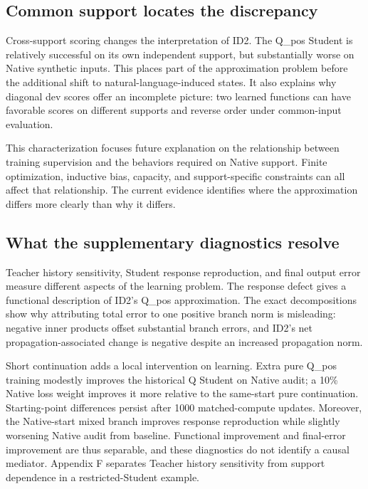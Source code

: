 \subsection{Common support locates the discrepancy}\label{common-support-locates-the-discrepancy}

Cross-support scoring changes the interpretation of ID2. The Q\_pos Student is relatively successful on its own independent support, but substantially worse on Native synthetic inputs. This places part of the approximation problem before the additional shift to natural-language-induced states. It also explains why diagonal dev scores offer an incomplete picture: two learned functions can have favorable scores on different supports and reverse order under common-input evaluation.

This characterization focuses future explanation on the relationship between training supervision and the behaviors required on Native support. Finite optimization, inductive bias, capacity, and support-specific constraints can all affect that relationship. The current evidence identifies where the approximation differs more clearly than why it differs.

\subsection{What the supplementary diagnostics resolve}\label{what-the-supplementary-diagnostics-resolve}

Teacher history sensitivity, Student response reproduction, and final output error measure different aspects of the learning problem. The response defect gives a functional description of ID2's Q\_pos approximation. The exact decompositions show why attributing total error to one positive branch norm is misleading: negative inner products offset substantial branch errors, and ID2's net propagation-associated change is negative despite an increased propagation norm.

Short continuation adds a local intervention on learning. Extra pure Q\_pos training modestly improves the historical Q Student on Native audit; a 10\% Native loss weight improves it more relative to the same-start pure continuation. Starting-point differences persist after 1000 matched-compute updates. Moreover, the Native-start mixed branch improves response reproduction while slightly worsening Native audit from baseline. Functional improvement and final-error improvement are thus separable, and these diagnostics do not identify a causal mediator. Appendix F separates Teacher history sensitivity from support dependence in a restricted-Student example.

